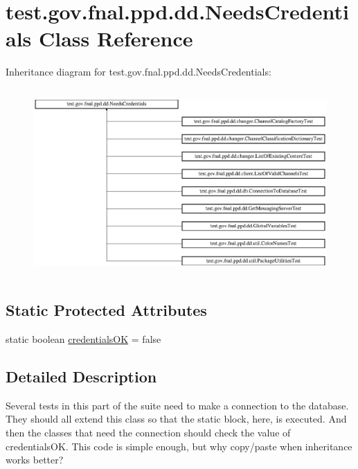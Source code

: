 \hypertarget{classtest_1_1gov_1_1fnal_1_1ppd_1_1dd_1_1NeedsCredentials}{\section{test.\-gov.\-fnal.\-ppd.\-dd.\-Needs\-Credentials Class Reference}
\label{classtest_1_1gov_1_1fnal_1_1ppd_1_1dd_1_1NeedsCredentials}
}
Inheritance diagram for test.\-gov.\-fnal.\-ppd.\-dd.\-Needs\-Credentials\-:\begin{figure}[H]
\begin{center}
\leavevmode
\includegraphics[height=7.179487cm]{classtest_1_1gov_1_1fnal_1_1ppd_1_1dd_1_1NeedsCredentials}
\end{center}
\end{figure}
\subsection*{Static Protected Attributes}
\begin{DoxyCompactItemize}
\item 
static boolean \hyperlink{classtest_1_1gov_1_1fnal_1_1ppd_1_1dd_1_1NeedsCredentials_a2db70b93bc3c6d68e11319152311d616}{credentials\-O\-K} = false
\end{DoxyCompactItemize}


\subsection{Detailed Description}
Several tests in this part of the suite need to make a connection to the database. They should all extend this class so that the static block, here, is executed. And then the classes that need the connection should check the value of credentials\-O\-K. This code is simple enough, but why copy/paste when inheritance works better?

